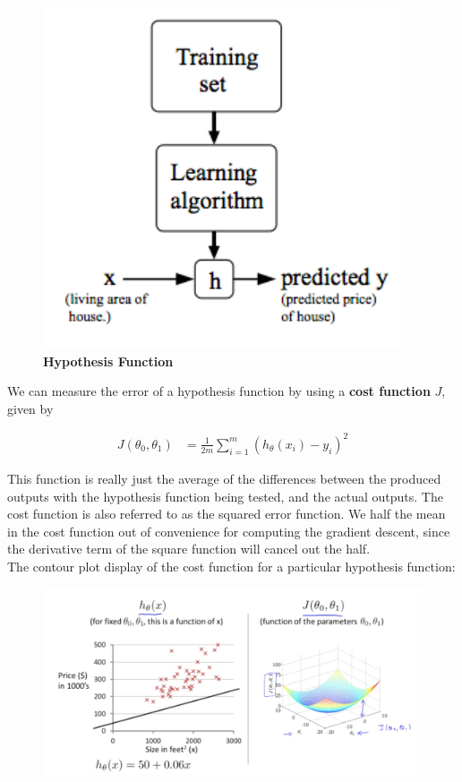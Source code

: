 \documentclass{article}
\begin{document}
        \begin{figure}[hbt!]
            \centering
            \includegraphics[scale=0.75]{Resources/Hypothesis_Function.png}
            \caption*{\textbf{Hypothesis Function}}
        \end{figure}

        \noindent We can measure the error of a hypothesis function by using a \textbf{cost function} $J$,
        given by

        \begin{align*}
            J(\theta_0,\theta_1)    &= \frac{1}{2m}\sum^m_{i=1}(h_\theta(x_i)-y_i)^2
        \end{align*}

        \noindent This function is really just the average of the differences between the produced outputs
        with the hypothesis function being tested, and the actual outputs. The cost function is also referred
        to as the squared error function. We half the mean in the cost function out of convenience for
        computing the gradient descent, since the derivative term of the square function will cancel out the
        half. \\

        \noindent The contour plot display of the cost function for a particular hypothesis function:

        \begin{figure}[hbt!]
            \centering
            \includegraphics[scale=0.75]{Resources/Contour.PNG}
        \end{figure}
\end{document}
